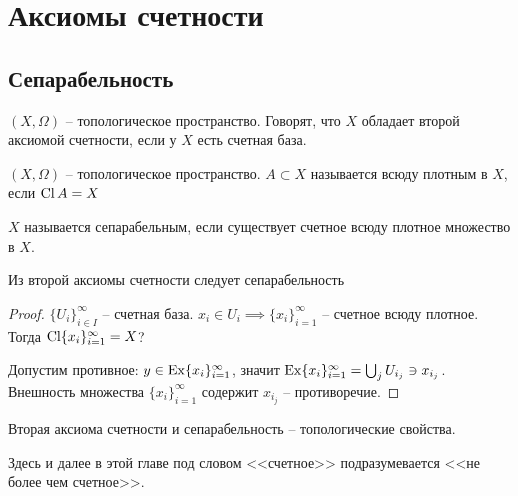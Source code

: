 \documentclass[main]{subfiles}
\begin{document}
\chapter{Аксиомы счетности}
\section{Сепарабельность}
\begin{definition}
    $(X, \Omega)$ -- топологическое пространство.
    Говорят, что $X$ обладает второй аксиомой счетности, если у $X$ есть счетная база.
\end{definition}

\begin{definition}
    $(X, \Omega)$ -- топологическое пространство.
    $A \subset X$ называется всюду плотным в $X$, если $\operatorname{Cl} A =  X$
\end{definition}

\begin{definition}
    $X$ называется сепарабельным, если существует счетное всюду плотное множество в $X$.
\end{definition}

\begin{theorem}
    Из второй аксиомы счетности следует сепарабельность
\end{theorem}
\begin{proof}
    $\{U_i\}_{i \in I}^\infty$ -- счетная база.
    $x_i \in U_i \implies \{x_i\}_{i=1}^\infty$ -- счетное всюду плотное.
    Тогда $\operatorname{Cl} \{x_i\}_{i=1}^\infty = X$?

    Допустим противное:
    $y \in \operatorname{Ex} \{x_i\}_{i=1}^\infty$, значит $\operatorname{Ex} \{x_i\}_{i=1}^\infty = \bigcup_j U_{i_j} \ni x_{i_j}$.
    Внешность множества $\{x_i\}_{i=1}^\infty$ содержит $x_{i_j}$ -- противоречие.
\end{proof}
\begin{remark}
    Вторая аксиома счетности и сепарабельность -- топологические свойства.
\end{remark}

Здесь и далее в этой главе под словом <<счетное>> подразумевается <<не более чем счетное>>.
\end{document}
